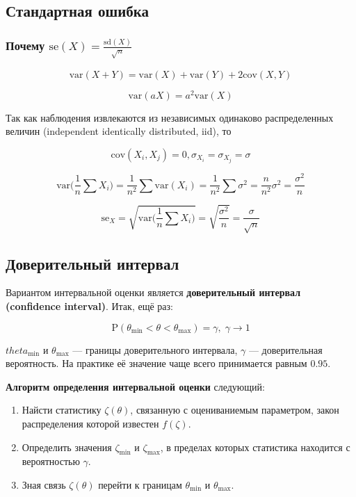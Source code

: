 \documentclass[
  letterpaper,
]{scrbook}
\providecommand{\tightlist}{%
  \setlength{\itemsep}{0pt}\setlength{\parskip}{0pt}}\usepackage{longtable,booktabs,array}
\newcommand{\var}{\text{var}}
\newcommand{\cov}{\text{cov}}
\newcommand{\se}{\text{se}}
\newcommand{\sd}{\text{sd}}
\theoremstyle{definition}
\theoremstyle{remark}
\begin{document}
\subsection{Стандартная
ошибка}\label{ux441ux442ux430ux43dux434ux430ux440ux442ux43dux430ux44f-ux43eux448ux438ux431ux43aux430}

\subsubsection{\texorpdfstring{Почему
\(\se(X) = \frac{\sd(X)}{\sqrt{n}}\)}{Почему \textbackslash se(X) = \textbackslash frac\{\textbackslash sd(X)\}\{\textbackslash sqrt\{n\}\}}}\label{ux43fux43eux447ux435ux43cux443-sex-fracsdxsqrtn}

\[
\var (X + Y) = \var (X) + \var(Y) + 2 \cov (X, Y)
\]

\[
\var (aX) = a^2 \var (X)
\]

Так как наблюдения извлекаются из независимых одинаково распределенных
величин (independent identically distributed, iid), то

\[
\cov (X_i, X_j) = 0, \sigma_{X_i} = \sigma_{X_j} = \sigma
\]

\[
\var \Big( \frac{1}{n} \sum X_i \Big) = \frac{1}{n^2} \sum \var(X_i) = \frac{1}{n^2} \sum \sigma^2 = \frac{n}{n^2} \sigma^2 = \frac{\sigma^2}{n}
\]

\[
\se_X = \sqrt{ \var \Big( \frac{1}{n} \sum X_i \Big)} = \sqrt{\frac{\sigma^2}{n}} = \frac{\sigma}{\sqrt{n}}
\]

\subsection{Доверительный
интервал}\label{ux434ux43eux432ux435ux440ux438ux442ux435ux43bux44cux43dux44bux439-ux438ux43dux442ux435ux440ux432ux430ux43b}

Вариантом интервальной оценки является \textbf{доверительный интервал
(confidence interval)}. Итак, ещё раз:

\[
\mathrm{P}(\theta_\min < \theta < \theta_\max) = \gamma, \; \gamma \rightarrow 1
\]

\(theta_\min\) и \(\theta_\max\) --- границы доверительного интервала,
\(\gamma\) --- доверительная вероятность. На практике её значение чаще
всего принимается равным \(0.95\).

\textbf{Алгоритм определения интервальной оценки} следующий:

\begin{enumerate}
\def\labelenumi{\arabic{enumi})}
\tightlist
\item
  Найсти статистику \(\zeta(\theta)\), связанную с оцениваниемым
  параметром, закон распределения которой известен \(f(\zeta)\).
\item
  Определить значения \(\zeta_\min\) и \(\zeta_\max\), в пределах
  которых статистика находится с вероятностью \(\gamma\).
\item
  Зная связь \(\zeta(\theta)\) перейти к границам \(\theta_\min\) и
  \(\theta_\max\).
\end{enumerate}
\end{document}

